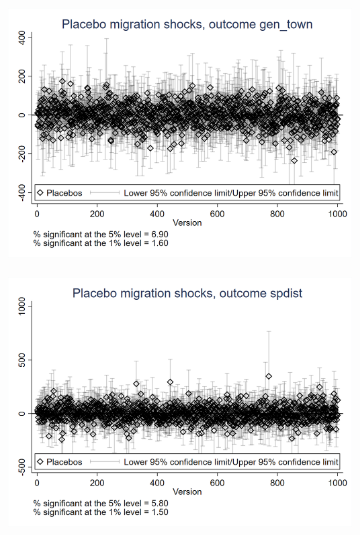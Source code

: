 \documentclass{article}
\begin{document}
\begin{figure}[htbp]
    \begin{subfigure}{0.3\textwidth}
        \includegraphics[width=\linewidth]{exhibits/figures/exogeneity_tests/D17_placebo_gen_town_urban.png}
        \label{fig:sub4}
    \end{subfigure}
    \begin{subfigure}{0.3\textwidth}
        \includegraphics[width=\linewidth]{exhibits/figures/exogeneity_tests/D17_placebo_spdist_urban.png}
        \label{fig:sub5}
    \end{subfigure}
    \begin{subfigure}{0.3\textwidth}

\end{subfigure}
\end{figure}
\end{document}
